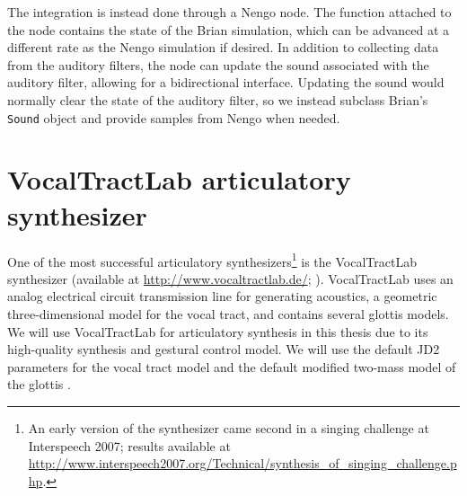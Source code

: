 The integration is instead done
through a Nengo node.
The function attached to the node
contains the state of the Brian simulation,
which can be advanced at a different rate
as the Nengo simulation if desired.
In addition to collecting
data from the auditory filters,
the node can update the
sound associated with
the auditory filter,
allowing for a bidirectional interface.
Updating the sound would normally
clear the state of the auditory filter,
so we instead subclass Brian's
\texttt{Sound} object
and provide samples from
Nengo when needed.

\section{VocalTractLab articulatory synthesizer}
\label{sec:vtl}

One of the most successful articulatory
synthesizers\footnote{An early version of the synthesizer
  came second in a singing challenge
  at Interspeech 2007; results available at
  \url{http://www.interspeech2007.org/Technical/synthesis_of_singing_challenge.php}.}
is the VocalTractLab synthesizer
(available at \url{http://www.vocaltractlab.de/};
\citealp{birkholz2013}).
VocalTractLab uses
an analog electrical circuit transmission line
for generating acoustics,
a geometric three-dimensional model for the vocal tract,
and contains several glottis models.
We will use VocalTractLab
for articulatory synthesis
in this thesis
due to its high-quality synthesis
and gestural control model.
We will use the default JD2 parameters
for the vocal tract model
and the default modified two-mass model
of the glottis \citep{birkholz2011}.
